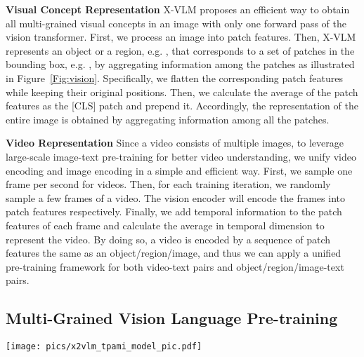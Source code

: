 \documentclass{article}
\newcommand{\baby}{X-VLM\xspace}
\begin{document}
\noindent\textbf{Visual Concept Representation} \baby proposes an efficient way to obtain all multi-grained visual concepts in an image with only one forward pass of the vision transformer. First, we process an image into patch features. Then, \baby represents an object or a region, e.g. , that corresponds to a set of patches in the bounding box, e.g. , by aggregating information among the patches as illustrated in Figure~\ref{Fig:vision}. Specifically, we flatten the corresponding patch features while keeping their original positions. Then, we calculate the average of the patch features as the [CLS] patch and prepend it. Accordingly, the representation of the entire image  is obtained by aggregating information among all the patches. 


\noindent\textbf{Video Representation} Since a video consists of multiple images, to leverage large-scale image-text pre-training for better video understanding, we unify video encoding and image encoding in a simple and efficient way. First, we sample one frame per second for videos. Then, for each training iteration, we randomly sample a few frames of a video. The vision encoder will encode the frames into patch features respectively. Finally, we add temporal information to the patch features of each frame and calculate the average in temporal dimension to represent the video. By doing so, a video is encoded by a sequence of patch features the same as an object/region/image, and thus we can apply a unified pre-training framework for both video-text pairs and object/region/image-text pairs. 





\subsection{Multi-Grained Vision Language Pre-training}
\label{sec:xvlm}


\begin{figure*}[t]
\begin{center}
\centerline{\texttt{[image: pics/x2vlm\_tpami\_model\_pic.pdf]}}
\caption{\textbf{Illustration of the proposed multi-grained vision language pre-training.} \baby consists of vision, text, and fusion modules. After encoding visual concepts (a) and text inputs (b), multi-grained vision features are then paired with corresponding text features for multi-grained aligning (c). Besides, the image is paired with different textual descriptions for multi-grained localization to predict the bounding box for each visual concept (d). All the datasets we used are publicly available (see Section~\ref{sec:pretraindata}).
}
\vspace{-0.5cm}
\label{Fig:model}
\end{center}
\end{figure*}
\end{document}
